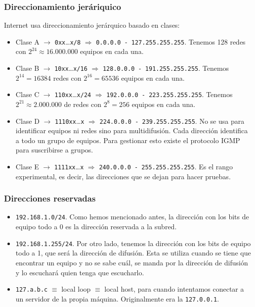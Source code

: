 \subsubsection{Direccionamiento jeráriquico}
\noindent
Internet usa direccionamiento jerárquico basado en clases:
\begin{itemize}
    \item Clase A $\rightarrow$ \verb|0xx|\ldots\verb|x/8| $\Longrightarrow $ \verb|0.0.0.0 - 127.255.255.255|. Tenemos 128 redes con $2^{24} \approx 16.000.000$ equipos en cada una. 
    \item Clase B $\rightarrow$ \verb|10xx|\ldots\verb|x/16| $\Longrightarrow $ \verb|128.0.0.0 - 191.255.255.255|. Tenemos $2^{14} = 16384$ redes con $2^{16}=65536$ equipos en cada una. 
    \item Clase C $\rightarrow$ \verb|110xx|\ldots\verb|x/24| $\Longrightarrow $ \verb|192.0.0.0 - 223.255.255.255|. Tenemos $2^{21} \approx 2.000.000$ de redes con $2^{8} = 256$ equipos en cada una. 
    \item Clase D $\rightarrow$ \verb|1110xx|\ldots\verb|x| $\Longrightarrow$ \verb|224.0.0.0 - 239.255.255.255|. No se usa para identificar equipos ni redes sino para multidifusión. Cada dirección identifica a todo un grupo de equipos. Para gestionar esto existe el protocolo IGMP para suscribirse a grupos. 
    \item Clase E $\rightarrow$ \verb|1111xx|\ldots\verb|x| $\Longrightarrow $ \verb|240.0.0.0 - 255.255.255.255|. Es el rango experimental, es decir, las direcciones que se dejan para hacer pruebas. 
\end{itemize}

\subsubsection{Direcciones reservadas}
\begin{itemize}
    \item \verb|192.168.1.0/24|. Como hemos mencionado antes, la dirección con los bits de equipo todo a 0 es la dirección reservada a la subred. 
    \item \verb|192.168.1.255/24|. Por otro lado, tenemos la dirección con los bits de equipo todo a 1, que será la dirección de difusión. Esta se utiliza cuando se tiene que encontrar un equipo y no se sabe cuál, se manda por la dirección de difusión y lo escuchará quien tenga que escucharlo. 
    \item \verb|127.a.b.c| $\equiv$ local loop $\equiv$ local host, para cuando intentamos conectar a un servidor de la propia máquina. Originalmente era la \verb|127.0.0.1|.
\end{itemize}


